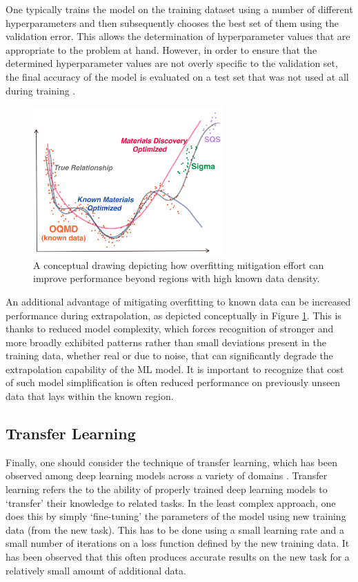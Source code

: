 One typically trains the model on the training dataset using a number of different hyperparameters and then subsequently chooses the best set of them using the validation error. This allows the determination of hyperparameter values that are appropriate to the problem at hand. However, in order to ensure that the determined hyperparameter values are not overly specific to the validation set, the final accuracy of the model is evaluated on a test set that was not used at all during training \cite{hastie2009elements}.

\begin{figure}[H]
    \centering
    \includegraphics[width=0.65\textwidth]{sipfenn/Overfitting_discovery.png}
    \caption{A conceptual drawing depicting how overfitting mitigation effort can improve performance beyond regions with high known data density.}
    \label{sipfenn:fig:overfitting_newregions}
\end{figure}

An additional advantage of mitigating overfitting to known data can be increased performance during extrapolation, as depicted conceptually in Figure \ref{sipfenn:fig:overfitting_newregions}. This is thanks to reduced model complexity, which forces recognition of stronger and more broadly exhibited patterns rather than small deviations present in the training data, whether real or due to noise, that can significantly degrade the extrapolation capability of the ML model. It is important to recognize that cost of such model simplification is often reduced performance on previously unseen data that lays within the known region.


\subsection{Transfer Learning} \label{sipfenn:ssec:transferlearning}
Finally, one should consider the technique of transfer learning, which has been observed among deep learning models across a variety of domains \cite{tan2018survey,cirecsan2012transfer,chang2017unsupervised,george2018deep}. Transfer learning refers the to the ability of properly trained deep learning models to `transfer' their knowledge to related tasks. In the least complex approach, one does this by simply `fine-tuning' the parameters of the model using new training data (from the new task). This has to be done using a small learning rate and a small number of iterations on a loss function defined by the new training data. It has been observed that this often produces accurate results on the new task for a relatively small amount of additional data. 

